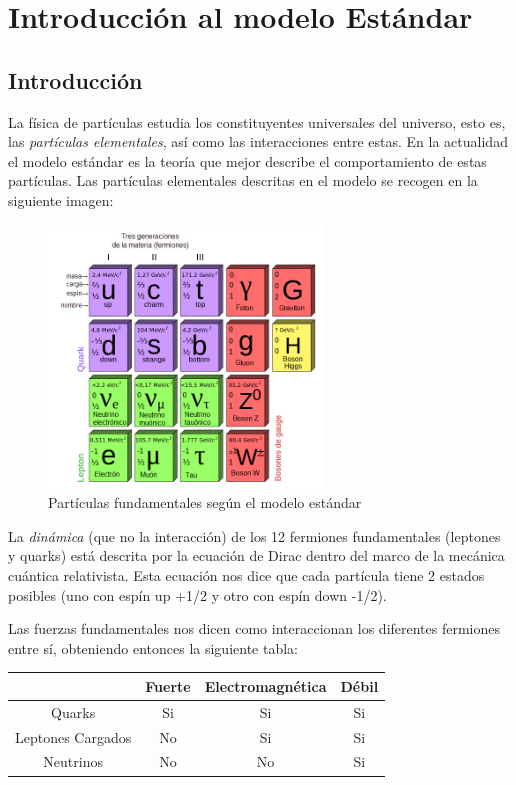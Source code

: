 
\chapter{Introducción al modelo Estándar}

\section{Introducción}
La física de partículas estudia los constituyentes universales del universo, esto es, las \textit{partículas elementales}, así como las interacciones entre estas. En la actualidad el modelo estándar es la teoría que mejor describe el comportamiento de estas partículas. Las partículas elementales descritas en el modelo se recogen en la siguiente imagen:

\begin{figure}[h!] \centering
	\includegraphics[width=0.65\textwidth]{Cuerpo/Ch_00/1_01_Modelo_Estandar.png}
	\caption{Partículas fundamentales según el modelo estándar}
\end{figure}


La \textit{dinámica} (que no la interacción) de los 12 fermiones fundamentales (leptones y quarks) está descrita por la ecuación de Dirac dentro del marco de la mecánica cuántica relativista. Esta ecuación nos dice que cada partícula tiene 2 estados posibles (uno con espín up +1/2 y otro con espín down -1/2).

Las fuerzas fundamentales nos dicen como interaccionan los diferentes fermiones entre sí, obteniendo entonces la siguiente tabla:

\begin{table}[h!] \centering
	\begin{tabular}{c|c c c}
		                  & Fuerte & Electromagnética & Débil \\ \hline
		Quarks            & Si     & Si               & Si    \\
		Leptones Cargados & No     & Si               & Si    \\
		Neutrinos         & No     & No               & Si    \\
	\end{tabular}
\end{table}


